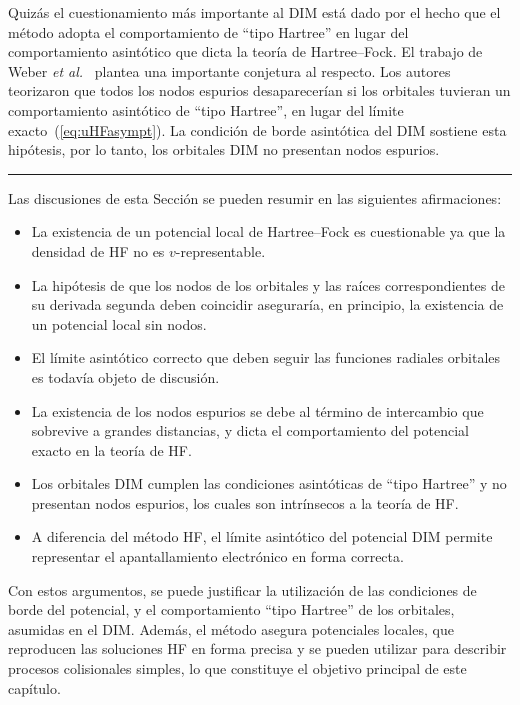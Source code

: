 Quizás el cuestionamiento más importante al DIM está dado por el hecho 
que el método adopta el comportamiento de ``tipo Hartree'' en lugar del 
comportamiento asintótico que dicta la teoría de Hartree--Fock. El 
trabajo de Weber \textit{et al.}~\cite{Weber:70} plantea una importante 
conjetura al respecto. Los autores teorizaron que todos los nodos 
espurios desaparecerían si los orbitales tuvieran un 
comportamiento asintótico de ``tipo Hartree'', en lugar del límite 
exacto~(\ref{eq:uHFasympt}). La condición de borde asintótica del DIM 
sostiene esta hipótesis, por lo tanto, los orbitales DIM no presentan 
nodos espurios.

\begin{center}
\rule[0.5ex]{0.8\linewidth}{0.5pt}
\end{center}

Las discusiones de esta Sección se pueden resumir en las siguientes 
afirmaciones:
\begin{itemize}
\item La existencia de un potencial local de Hartree--Fock es 
cuestionable ya que la densidad de HF no es $v$-representable.
\item La hipótesis de que los nodos de los orbitales y las raíces 
correspondientes de su derivada segunda deben coincidir aseguraría, en 
principio, la existencia de un potencial local sin nodos.
\item El límite asintótico correcto que deben seguir las funciones 
radiales orbitales es todavía objeto de discusión. 
\item La existencia de los nodos espurios se debe al término de 
intercambio que sobrevive a grandes distancias, y dicta el 
comportamiento del potencial exacto en la teoría de HF.
\item Los orbitales DIM cumplen las condiciones asintóticas de ``tipo 
Hartree'' y no presentan nodos espurios, los cuales son intrínsecos a la 
teoría de HF.
\item A diferencia del método HF, el límite asintótico del potencial DIM 
permite representar el apantallamiento electrónico en forma correcta.
\end{itemize}
Con estos argumentos, se puede justificar la utilización de las 
condiciones de borde del potencial, y el comportamiento ``tipo Hartree'' 
de los orbitales, asumidas en el DIM. Además, el método asegura 
potenciales locales, que reproducen las soluciones HF en forma precisa
y se pueden utilizar para describir procesos colisionales simples, lo 
que constituye el objetivo principal de este capítulo.

